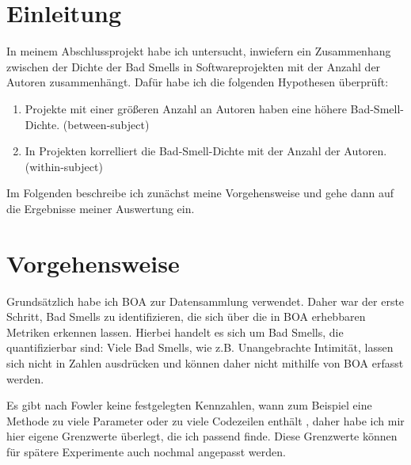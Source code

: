 \documentclass[12pt]{article}
\date{}
\begin{document}
\section{Einleitung}
In meinem Abschlussprojekt habe ich untersucht, inwiefern ein Zusammenhang zwischen der Dichte der Bad Smells in Softwareprojekten mit der Anzahl der Autoren zusammenhängt.
Dafür habe ich die folgenden Hypothesen überprüft:
\begin{enumerate}
	\item Projekte mit einer größeren Anzahl an Autoren haben eine höhere Bad-Smell-Dichte. (between-subject)
	\item In Projekten korrelliert die Bad-Smell-Dichte mit der Anzahl der Autoren. (within-subject)
\end{enumerate}

Im Folgenden beschreibe ich zunächst meine Vorgehensweise und gehe dann auf die Ergebnisse meiner Auswertung ein.

\section{Vorgehensweise}
Grundsätzlich habe ich BOA \cite{boa} zur Datensammlung verwendet.
Daher war der erste Schritt, Bad Smells zu identifizieren, die sich über die in BOA erhebbaren Metriken erkennen lassen.
Hierbei handelt es sich um Bad Smells, die quantifizierbar sind:
Viele Bad Smells, wie z.B. Unangebrachte Intimität, lassen sich nicht in Zahlen ausdrücken und können daher nicht mithilfe von BOA erfasst werden.

Es gibt nach Fowler keine festgelegten Kennzahlen, wann zum Beispiel eine Methode zu viele Parameter oder zu viele Codezeilen enthält \cite{fowler2018refactoring}, daher habe ich mir hier eigene Grenzwerte überlegt, die ich passend finde.
Diese Grenzwerte können für spätere Experimente auch nochmal angepasst werden.
\end{document}
